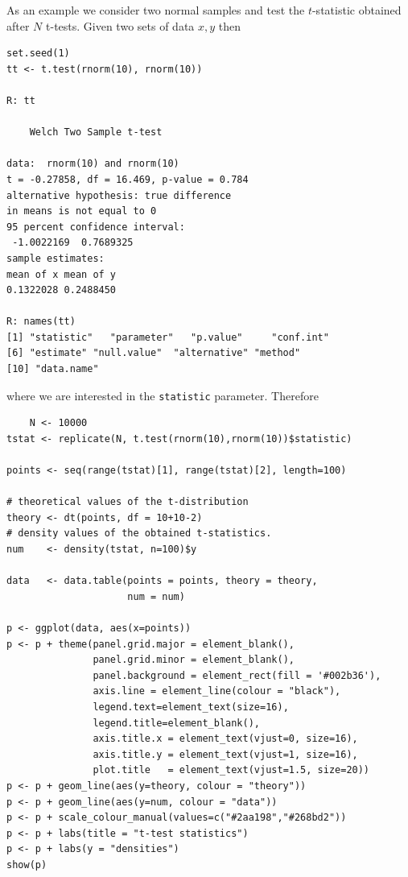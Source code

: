 As an example we consider two normal samples and test 
the $t$-statistic obtained after $N$ t-tests. Given 
two sets of data $x, y$ then
\begin{verbatim}
set.seed(1)
tt <- t.test(rnorm(10), rnorm(10))

R: tt

	Welch Two Sample t-test

data:  rnorm(10) and rnorm(10)
t = -0.27858, df = 16.469, p-value = 0.784
alternative hypothesis: true difference 
in means is not equal to 0
95 percent confidence interval:
 -1.0022169  0.7689325
sample estimates:
mean of x mean of y 
0.1322028 0.2488450 

R: names(tt)
[1] "statistic"   "parameter"   "p.value"     "conf.int"       
[6] "estimate" "null.value"  "alternative" "method"      
[10] "data.name"
\end{verbatim}
where we are interested in the \texttt{statistic} parameter.
Therefore
\begin{verbatim}
    N <- 10000
tstat <- replicate(N, t.test(rnorm(10),rnorm(10))$statistic)

points <- seq(range(tstat)[1], range(tstat)[2], length=100)

# theoretical values of the t-distribution
theory <- dt(points, df = 10+10-2)  
# density values of the obtained t-statistics.
num    <- density(tstat, n=100)$y

data   <- data.table(points = points, theory = theory,
                     num = num)

p <- ggplot(data, aes(x=points))
p <- p + theme(panel.grid.major = element_blank(), 
               panel.grid.minor = element_blank(),
               panel.background = element_rect(fill = '#002b36'),
               axis.line = element_line(colour = "black"),
               legend.text=element_text(size=16),
               legend.title=element_blank(),
               axis.title.x = element_text(vjust=0, size=16),
               axis.title.y = element_text(vjust=1, size=16),
               plot.title   = element_text(vjust=1.5, size=20)) 
p <- p + geom_line(aes(y=theory, colour = "theory"))
p <- p + geom_line(aes(y=num, colour = "data"))
p <- p + scale_colour_manual(values=c("#2aa198","#268bd2"))
p <- p + labs(title = "t-test statistics")
p <- p + labs(y = "densities")
show(p)  
\end{verbatim}

